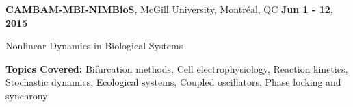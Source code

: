 \documentclass[margin,line]{res}
\newenvironment{list1}{
  \begin{list}{\ding{113}}{
      \setlength{\itemsep}{0in}
      \setlength{\parsep}{0in} \setlength{\parskip}{0in}
      \setlength{\topsep}{0in} \setlength{\partopsep}{0in}
      \setlength{\leftmargin}{0.17in}}}{\end{list}}
\begin{document}
\begin{resume}
{\bf CAMBAM-MBI-NIMBioS}, McGill University, Montr\'eal, QC \hfill {\bf Jun 1 - 12, 2015}\\
\vspace*{-.2cm}
\begin{list1}
\item[] Nonlinear Dynamics in Biological Systems
\vspace*{0.2cm}
\item[] {\bf Topics Covered:} Bifurcation methods, Cell electrophysiology, Reaction kinetics, Stochastic dynamics, Ecological systems, Coupled oscillators, Phase locking and synchrony
\end{list1}














\end{resume}
\end{document}
